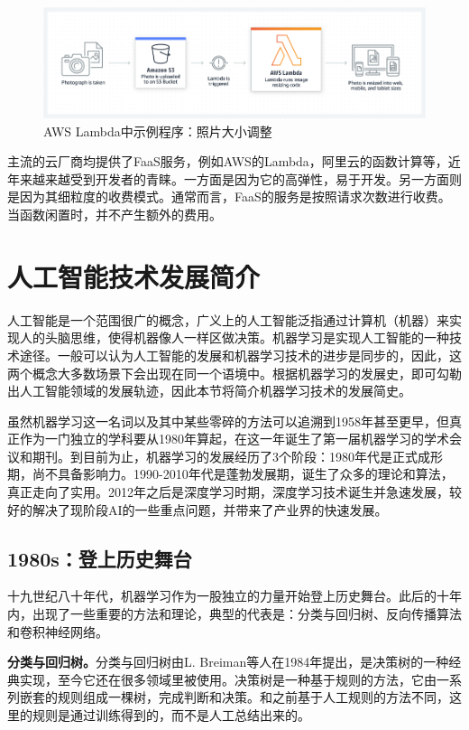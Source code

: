 \begin{figure}
    \centerline{\includegraphics[width=\textwidth]{figures/aws-lambda-resize.png}}
    \caption{AWS Lambda中示例程序：照片大小调整}
    \label{aws_resize}
\end{figure}

主流的云厂商均提供了FaaS服务，例如AWS的Lambda，阿里云的函数计算等，近年来越来越受到开发者的青睐。一方面是因为它的高弹性，易于开发。另一方面则是因为其细粒度的收费模式。通常而言，FaaS的服务是按照请求次数进行收费。当函数闲置时，并不产生额外的费用。

\section{人工智能技术发展简介}\label{sec_ml_history}
人工智能是一个范围很广的概念，广义上的人工智能泛指通过计算机（机器）来实现人的头脑思维，使得机器像人一样区做决策。机器学习是实现人工智能的一种技术途径。一般可以认为人工智能的发展和机器学习技术的进步是同步的，因此，这两个概念大多数场景下会出现在同一个语境中。根据机器学习的发展史，即可勾勒出人工智能领域的发展轨迹，因此本节将简介机器学习技术的发展简史。

虽然机器学习这一名词以及其中某些零碎的方法可以追溯到1958\parencite{samuel1995some}年甚至更早，但真正作为一门独立的学科要从1980年算起，在这一年诞生了第一届机器学习的学术会议和期刊。到目前为止，机器学习的发展经历了3个阶段：1980年代是正式成形期，尚不具备影响力。1990-2010年代是蓬勃发展期，诞生了众多的理论和算法，真正走向了实用。2012年之后是深度学习时期，深度学习技术诞生并急速发展，较好的解决了现阶段AI的一些重点问题，并带来了产业界的快速发展。

\subsection{1980s：登上历史舞台}
十九世纪八十年代，机器学习作为一股独立的力量开始登上历史舞台。此后的十年内，出现了一些重要的方法和理论，典型的代表是：分类与回归树\parencite{breiman1983classification}、反向传播算法\parencite{rumelhart1986learning}和卷积神经网络\parencite{lecun1989backpropagation}。

\textbf{分类与回归树。}分类与回归树由L. Breiman等人在1984年提出，是决策树的一种经典实现，至今它还在很多领域里被使用。决策树是一种基于规则的方法，它由一系列嵌套的规则组成一棵树，完成判断和决策。和之前基于人工规则的方法不同，这里的规则是通过训练得到的，而不是人工总结出来的。

